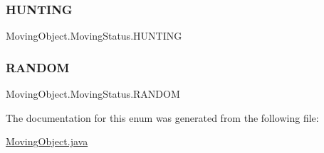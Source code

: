 \subsubsection{\texorpdfstring{H\+U\+N\+T\+I\+NG}{HUNTING}}
{\footnotesize\ttfamily Moving\+Object.\+Moving\+Status.\+H\+U\+N\+T\+I\+NG}

\mbox{\label{enum_moving_object_1_1_moving_status_ab46cd9780091a74038f2bba2e15998d7}} 
\subsubsection{\texorpdfstring{R\+A\+N\+D\+OM}{RANDOM}}
{\footnotesize\ttfamily Moving\+Object.\+Moving\+Status.\+R\+A\+N\+D\+OM}



The documentation for this enum was generated from the following file\+:\begin{DoxyCompactItemize}
\item 
\mbox{\hyperlink{_moving_object_8java}{Moving\+Object.\+java}}\end{DoxyCompactItemize}
